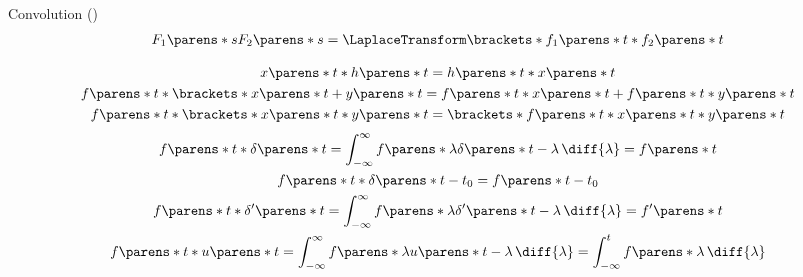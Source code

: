 \begin{multicols}{2}
\begin{CheatsheetEntryFrameEnd}
\begin{center}
            Convolution ()
            \begin{gather*}
                F_1\parens*{s} F_2\parens*{s}
                = \LaplaceTransform\brackets*{f_1\parens*{t} * f_2\parens*{t}}
            \end{gather*}
        \end{center}

        \begin{gather*}
            x\parens*{t} * h\parens*{t} = h\parens*{t} * x\parens*{t}
            \\
            f\parens*{t} * \brackets*{x\parens*{t} + y\parens*{t}}
            = f\parens*{t} * x\parens*{t} + f\parens*{t} * y\parens*{t}
            \\
            f\parens*{t} * \brackets*{x\parens*{t} * y\parens*{t}}
            = \brackets*{f\parens*{t} * x\parens*{t}} * y\parens*{t}
        \end{gather*}
        \begin{gather*}
            f\parens*{t} * \delta\parens*{t}
            = \int_{-\infty}^\infty {
                f\parens*{\lambda} \delta\parens*{t - \lambda} \,\diff{\lambda}
            }
            = f\parens*{t}
            \\
            f\parens*{t} * \delta\parens*{t - t_0}
            = f\parens*{t - t_0}
            \\
            f\parens*{t} * \delta'\parens*{t}
            = \int_{-\infty}^\infty {
                f\parens*{\lambda} \delta'\parens*{t - \lambda} \,\diff{\lambda}
            }
            = f'\parens*{t}
            \\
            f\parens*{t} * u\parens*{t}
            = \int_{-\infty}^\infty {
                f\parens*{\lambda} u\parens*{t - \lambda} \,\diff{\lambda}
            }
            = \int_{-\infty}^t f\parens*{\lambda} \,\diff{\lambda}
        \end{gather*}

    \end{CheatsheetEntryFrameEnd}
    
\end{multicols}
\newpage
